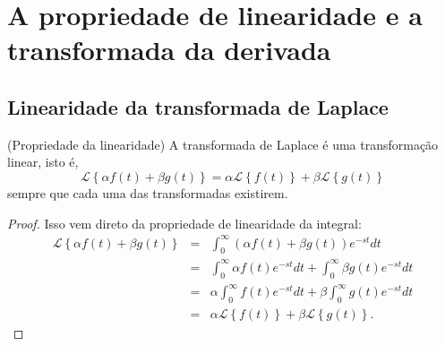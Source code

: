 \chapter{A propriedade de linearidade e a transformada da derivada}
\section{Linearidade da transformada de Laplace}
\begin{teo}{\label{prop_lin}}(Propriedade da linearidade)
A transformada de Laplace é uma transformação linear, isto é,
\begin{equation}
\mathcal{L }\left\{\alpha f(t)+\beta g(t)\right\}=\alpha \mathcal{L }\left\{ f(t)\right\}+\beta\mathcal{L }\left\{g(t)\right\}
\end{equation}
sempre que cada uma das transformadas existirem. 
\end{teo}
\begin{proof}
Isso vem direto da propriedade de linearidade da integral:
\begin{eqnarray*}
\mathcal{L }\left\{\alpha f(t)+\beta g(t)\right\}&=&\int_0^\infty \left(\alpha f(t)+\beta g(t)\right)e^{-st}dt\\
&=&\int_0^\infty \alpha f(t)e^{-st}dt+\int_0^\infty\beta g(t)e^{-st}dt\\
&=&\alpha\int_0^\infty  f(t)e^{-st}dt+\beta\int_0^\infty g(t)e^{-st}dt\\
&=&\alpha \mathcal{L }\left\{ f(t)\right\}+\beta\mathcal{L }\left\{g(t)\right\}.
\end{eqnarray*}
\end{proof}
